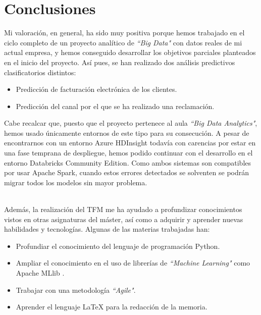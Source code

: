 \chapter{Conclusiones}
\label{chapter:conclusiones}

Mi valoración, en general, ha sido muy positiva porque hemos trabajado en el ciclo completo de un proyecto analítico de \textit{``Big Data"} con datos reales de mi actual empresa, y hemos conseguido desarrollar los objetivos parciales planteados en el inicio del proyecto. Así pues, se han realizado dos análisis predictivos clasificatorios distintos:
\begin{itemize}
    \item Predicción de facturación electrónica de los clientes.
    \item Predicción del canal por el que se ha realizado una reclamación.
\end{itemize}

Cabe recalcar que, puesto que el proyecto pertenece al aula \textit{``Big Data Analytics"}, hemos usado únicamente entornos de este tipo para su consecución.
A pesar de encontrarnos con un entorno Azure HDInsight todavía con carencias por estar en una fase temprana de despliegue, hemos podido continuar con el desarrollo en el entorno Databricks Community Edition. Como ambos sistemas son compatibles por usar Apache Spark, cuando estos errores detectados se solventen se podrán migrar todos los modelos sin mayor problema.

\\

Además, la realización del TFM me ha ayudado a profundizar conocimientos vistos en otras asignaturas del máster, así como a adquirir y aprender nuevas habilidades y tecnologías.
Algunas de las materias trabajadas han:
\begin{itemize}
    \item Profundiar el conocimiento del lenguaje de programación Python.
    \item Ampliar el conocimiento en el uso de librerías de \textit{``Machine Learning"} como Apache MLlib \cite{mllib}.
    \item Trabajar con una metodología \textit{``Agile"}.
    \item Aprender el lenguaje LaTeX\cite{latex} para la redacción de la memoria.
\end{itemize}
\\

